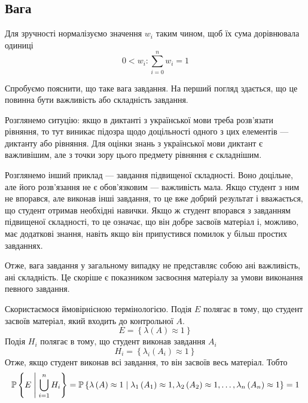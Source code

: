 \subsection{Вага}
\label{subsec:weight}

Для зручності нормалізуємо значення $w_i$ таким чином, щоб їх сума дорівнювала
одиниці
\begin{equation*}
  0 < w_i: \sum_{i=0}^{n} w_i = 1
\end{equation*}

Спробуємо пояснити, що таке вага завдання.
На перший погляд здається, що це повинна бути важливість або складність
завдання.

Розглянемо ситуцію: якщо в диктанті з української мови треба розв’язати
рівняння, то тут виникає підозра щодо доцільності одного з цих елементів ---
диктанту або рівняння.
Для оцінки знань з української мови диктант є важливішим, але з точки зору
цього предмету рівняння є складнішим.

Розглянемо інший приклад --- завдання підвищеної складності.
Воно доцільне, але його розв’язання не є обов’язковим --- важливість мала.
Якщо студент з ним не впорався, але виконав інші завдання, то це вже добрий
результат і вважається, що студент отримав необхідні навички.
Якщо ж студент впорався з завданням підвищеної складності, то це означає, що
він добре засвоїв матеріал і, можливо, має додаткові знання, навіть якщо він
припустився помилок у більш простих завданнях.

Отже, вага завдання у загальному випадку не представляє собою ані важливість,
ані складність.
Це скоріше є показником засвоєння матеріалу за умови виконання певного завдання.

Скористаємося ймовірнісною термінологією.
Подія $E$ полягає в тому, що студент засвоїв матеріал, який входить до
контрольної $A$.
\begin{equation*}
  E = \left\{ \lambda\left( A \right) \approx 1 \right\}
\end{equation*}
Подія $H_i$ полягає в тому, що студент виконав завдання $A_i$
\begin{equation*}
  H_i = \left\{ \lambda_i\left( A_i \right) \approx 1 \right\}
\end{equation*}
Отже, якщо студент виконав всі завдання, то він засвоїв весь
матеріал.
Тобто
\begin{equation*}
  \mathbb{P}\left\{ E \;\middle|\; \bigcup_{i=1}^n H_i \right\}
  = \mathbb{P}\left\{ \lambda\left( A \right) \approx 1 \;\middle|\;
    \lambda_1\left( A_1 \right) \approx 1,
    \lambda_2\left( A_2 \right) \approx 1,
    \dots,
    \lambda_n\left( A_n \right) \approx 1 \right\}
  = 1
\end{equation*}

